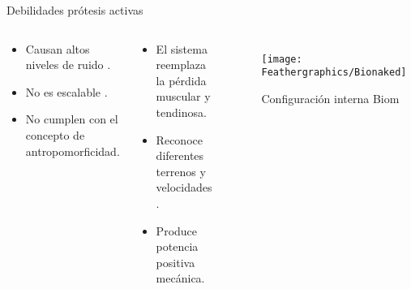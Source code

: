 \documentclass[10pt]{beamer}
\begin{document}
\begin{frame}{Debilidades prótesis activas}

\begin{columns}[t]


\column{60 mm}
\begin{alertblock}{}

\begin{itemize}
\item {\scriptsize{}Causan altos niveles de ruido \cite{boston}.}{\scriptsize \par}
\item {\scriptsize{}No es escalable \cite{BIOMASME}.}{\scriptsize \par}
\item {\scriptsize{}No cumplen con el concepto de antropomorficidad\cite{BIOMASME}.}{\scriptsize \par}
\end{itemize}
\end{alertblock}
\begin{exampleblock}{}

\begin{itemize}
\item {\footnotesize{}El sistema reemplaza la pérdida muscular y tendinosa\cite{Varol2010}. }{\footnotesize \par}
\item {\footnotesize{}Reconoce diferentes terrenos y velocidades \cite{Lawson2011}. }{\footnotesize \par}
\item {\footnotesize{}Produce potencia positiva mecánica\cite{Martinez-Villalpando2009}.}{\footnotesize \par}
\end{itemize}
\end{exampleblock}

\column{60 mm}

\begin{figure}
\begin{centering}
\texttt{[image: Feathergraphics/Bionaked]}
\par\end{centering}
{\scriptsize{}\caption{Configuración interna Biom \cite{boston}}
}{\scriptsize \par}

\end{figure}

\end{columns}

\end{frame}
\end{document}
